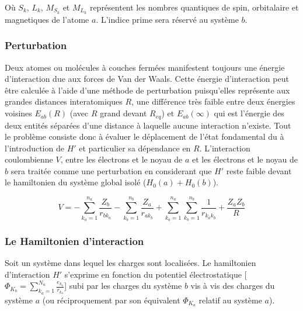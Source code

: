 Où $S_{k}$, $L_{k}$, $M_{S_{k}}$ et $M_{L_{k}}$ représentent les nombres quantiques de spin, orbitalaire et magnetiques de l'atome $a$. L'indice prime sera réservé au système $b$.

\subsubsection{Perturbation}

Deux atomes ou molécules à couches fermées manifestent toujours une énergie d'interaction due aux forces de Van der Waals. Cette énergie d'interaction peut être calculée à l'aide d'une méthode de perturbation puisqu'elles représente aux grandes distances interatomiques $R$, une différence très faible entre deux énergies voisines $E_{ab}(R)$ (avec $R$ grand devant $R_{eq}$) et $E_{ab}(\infty)$ qui est l'énergie des deux entités séparées d'une distance à laquelle aucune interaction n'existe.
Tout le problème consiste donc à évaluer le déplacement de l'état fondamental du à l'introduction de $H'$ et particulier sa dépendance en $R$. L'interaction coulombienne $V$, entre les électrons et le noyau de $a$ et les électrons et le noyau de $b$ sera traitée comme une perturbation en considerant que $H'$ reste faible devant le hamiltonien du système global isolé ($H_{0}(a)+ H_{0}(b)$). 

	
	\begin{equation}
	V = - \sum_{k_{a}=1}^{n_{a}} \frac{Z_{b}}{r_{bk_{a}}} - \sum_{k_{b}=1}^{n_{b}} \frac{Z_{a}}{r_{ak_{b}}} + \sum_{k_{a}=1}^{n_{a}} \sum_{k_{b}=1}^{n_{b}} \frac{1}{r_{k_{a}k_{b}}} + \frac{Z_{a} Z_{b}}{R}
	\end{equation}
	
	\subsubsection{Le Hamiltonien d'interaction}
	
	Soit un système dans lequel les charges sont localisées. Le hamiltonien d'interaction $H'$ s'exprime en fonction du potentiel électrostatique [$\Phi_{K_{b}}= \sum_{k_{a}=1}^{N_{a}} \frac{e_{k_{a}}}{r_{k_{a}}}$] subi par les charges du système $b$ vis à vis des charges du système $a$ (ou réciproquement par son équivalent $\Phi_{K_{a}}$ relatif au système $a$).
	
